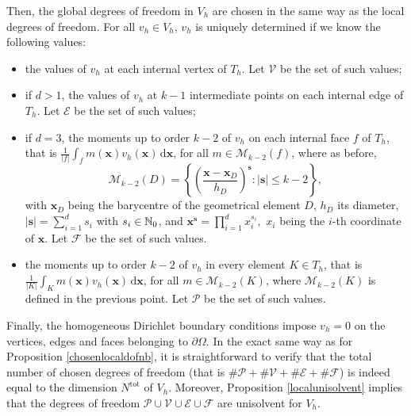 Then, the global degrees of freedom in $V_h$ are chosen in the same way as the local degrees of freedom. For all $v_h\in V_h$, $v_h$ is uniquely determined if we know the following values:
\begin{itemize}
\item the values of $v_h$ at each internal vertex of $T_h$. Let $\mathcal{V}$ be the set of such values;
\item if $d>1$, the values of $v_h$ at $k-1$ intermediate points on each internal edge of $T_h$. Let $\mathcal{E}$ be the set of such values;
\item if $d=3$, the moments up to order $k-2$ of $v_h$ on each internal face $f$ of $T_h$, that is $\frac{1}{|f|}\int_{f}m(\mathbf{x})v_h(\mathbf{x})\, \mathrm{d}\mathbf{x}$, for all $m\in \mathcal{M}_{k-2}(f)$, where as before, $$\mathcal{M}_{k-2}(D) = \left\{\left(\frac{\mathbf{x}-\mathbf{x}_D}{h_D}\right)^\mathbf{s} : |\mathbf{s}|\leq k-2\right\},$$ with $\mathbf{x}_D$ being the barycentre of the geometrical element $D$, $h_D$ its diameter, $|\mathbf{s}| = \sum_{i=1}^d s_i$ with $s_i\in \mathbb{N}_0$, and $\mathbf{x}^\mathbf{s}=\prod_{i=1}^d x_i^{s_i},$ $x_i$ being the $i$-th coordinate of $\mathbf{x}$. Let $\mathcal{F}$ be the set of such values.
\item the moments up to order $k-2$ of $v_h$ in every element $K\in T_h$, that is $\frac{1}{|K|}\int_Km(\mathbf{x})v_h(\mathbf{x})\, \mathrm{d}\mathbf{x}$, for all $m\in \mathcal{M}_{k-2}(K)$, where $\mathcal{M}_{k-2}(K)$ is defined in the previous point. Let $\mathcal{P}$ be the set of such values.
\end{itemize}
Finally, the homogeneous Dirichlet boundary conditions impose $v_h=0$ on the vertices, edges and faces belonging to $\partial \Omega$. In the exact same way as for Proposition \ref{chosenlocaldofnb}, it is straightforward to verify that the total number of chosen degrees of freedom (that is $\#\mathcal{P}+\#\mathcal{V}+\#\mathcal{E}+\#\mathcal{F}$) is indeed equal to the dimension $N^\text{tot}$ of $V_h$. Moreover, Proposition \ref{localunisolvent} implies that the degrees of freedom $\mathcal{P}\cup\mathcal{V}\cup\mathcal{E}\cup\mathcal{F}$ are unisolvent for $V_h$. \\

